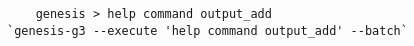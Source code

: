 \begin{verbatim}
    genesis > help command output_add
`genesis-g3 --execute 'help command output_add' --batch`
\end{verbatim}
